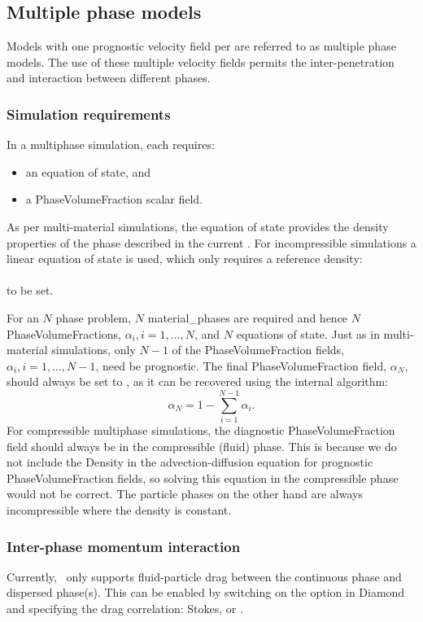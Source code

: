 \subsection{Multiple phase models}
Models with one prognostic velocity field per  are referred to as multiple phase models. The use of these multiple velocity fields permits the inter-penetration and interaction between different phases.

\subsubsection{Simulation requirements}
In a multiphase simulation, each  requires:
\begin{itemize}
 \item an equation of state, and
 \item a PhaseVolumeFraction scalar field.
\end{itemize}

As per multi-material simulations, the equation of state provides the density properties of the phase described in the current . For incompressible simulations a linear equation of state is used, which only requires a reference density:\\
\\
to be set.

For an $N$ phase problem, $N$ material\_phases are required and hence $N$ PhaseVolumeFractions, $\alpha_i, i = 1, \ldots, N$, and $N$ equations of state. Just as in multi-material simulations, only $N-1$ of the PhaseVolumeFraction fields, $\alpha_i, i = 1, \ldots, N-1$, need be prognostic. The final PhaseVolumeFraction field, $\alpha_N$, should always be set to , as it can be recovered using the internal algorithm:
\begin{equation}
\alpha_N = 1 - \sum_{i=1}^{N-1}\alpha_i\textrm{.}
\end{equation}
For compressible multiphase simulations, the diagnostic PhaseVolumeFraction field should always be in the compressible (fluid) phase. This is because we do not include the Density in the advection-diffusion equation for prognostic PhaseVolumeFraction fields, so solving this equation in the compressible phase would not be correct. The particle phases on the other hand are always incompressible where the density is constant.

\subsubsection{Inter-phase momentum interaction}
Currently, \fluidity\ only supports fluid-particle drag between the continuous phase and dispersed phase(s). This can be enabled by switching on the  option in Diamond and specifying the drag correlation: Stokes, \cite{wen_yu_1966} or \cite{ergun1952}.

